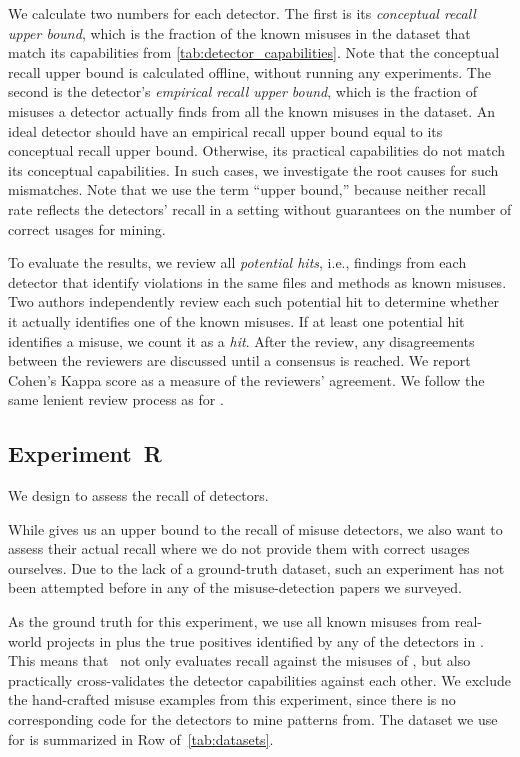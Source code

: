 We calculate two numbers for each detector.
The first is its  \emph{conceptual recall upper bound}, which is the fraction of the known misuses in the dataset that match its capabilities from \autoref{tab:detector_capabilities}.
Note that the conceptual recall upper bound is calculated offline, without running any experiments.
The second is the detector's \emph{empirical recall upper bound}, which is the fraction of misuses a detector actually finds from all the known misuses in the dataset.
An ideal detector should have an empirical recall upper bound equal to its conceptual recall upper bound.
Otherwise, its practical capabilities do not match its conceptual capabilities.
In such cases, we investigate the root causes for such mismatches.
Note that we use the term ``upper bound,'' because neither recall rate reflects the detectors' recall in a setting without guarantees on the number of correct usages for mining.

To evaluate the results, we review all \emph{potential hits}, i.e., findings from each detector that identify violations in the same files and methods as known misuses.
Two authors independently review each such potential hit to determine whether it actually identifies one of the known misuses.
If at least one potential hit identifies a misuse, we count it as a \emph{hit}.
%
After the review, any disagreements between the reviewers are discussed until a consensus is reached.
We report Cohen's Kappa score as a measure of the reviewers' agreement.
%
We follow the same lenient review process as for .


\subsection{Experiment~R}
\label{e3}

We design  to assess the recall of detectors.

While  gives us an upper bound to the recall of misuse detectors, we also want to assess their actual recall where we do not provide them with correct usages ourselves.
Due to the lack of a ground-truth dataset, such an experiment has not been attempted before in any of the misuse-detection papers we surveyed.

As the ground truth for this experiment, we use all known misuses from real-world projects in \MUBench plus the true positives identified by any of the detectors in .
This means that~ not only evaluates recall against the misuses of \MUBench, but also practically cross-validates the detector capabilities against each other.
We exclude the hand-crafted misuse examples from this experiment, since there is no corresponding code for the detectors to mine patterns from.
The dataset we use for  is summarized in Row  of~\autoref{tab:datasets}.

